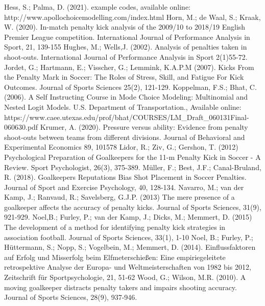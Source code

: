 \documentclass[12pt,dvipsnames]{article}%
\begin{document}
\begin{thebibliography}{99}
 Hess, S.; Palma, D. (2021). example codes, available online: http://www.apollochoicemodelling.com/index.html
 Horn, M.; de Waal, S.; Kraak, W. (2020). In-match penalty kick analysis of the 2009/10 to 2018/19 English Premier League competition. International Journal of Performance Analysis in Sport, 21, 139-155
 Hughes, M.; Wells,J. (2002). Analysis of penalties taken in shoot-outs. International Journal of Performance Analysis in Sport 2(1)55-72.
 Jordet, G.; Hartmann, E.; Visscher, G.; Lemmink, K.A.P.M (2007). Kicks From the Penalty Mark in Soccer: The Roles of Stress, Skill, and Fatigue For Kick Outcomes. Journal of Sports Sciences 25(2), 121-129.
 Koppelman, F.S.; Bhat, C. (2006). A Self Instructing Course in Mode Choice Modeling: Multinomial and Nested Logit Models. U.S. Department of Transportation., Available online: \small{https://www.caee.utexas.edu/prof/bhat/COURSES/LM\_Draft\_060131Final-060630.pdf}
 Krumer, A. (2020). Pressure versus ability: Evidence from penalty shoot-outs between teams from different divisions. Journal of Behavioral and Experimental Economics 89, 101578
 Lidor, R.; Ziv, G.; Gershon, T. (2012) Psychological Preparation of Goalkeepers for the 11-m Penalty Kick in Soccer - A Review. Sport Psychologist, 26(3), 375-389.
 M\"uller, F.; Best, J.F.; Canal-Bruland, R. (2018). Goalkeepers Reputations Bias Shot Placement in Soccer Penalties. Journal of Sport and Exercise Psychology, 40, 128-134.
 Navarro, M.; van der Kamp, J.; Ranvaud, R.; Savelsberg, G.J.P. (2013) The mere presence of a goalkeeper affects the accuracy of penalty kicks. Journal of Sports Sciences, 31(9), 921-929.
 Noel,B.; Furley, P.; van der Kamp, J.; Dicks, M.; Memmert, D. (2015) The development of a method for identifying penalty kick strategies
in association football. Journal of Sports Sciences, 33(1), 1-10
 Noel, B.; Furley, P.; H{\"u}ttermann, S.; Nopp, S.; Vogelbein, M.; Memmert, D. (2014). Einflussfaktoren auf Erfolg und Misserfolg beim Elfmeterschie\ss{}en:
Eine empiriegeleitete retrospektive Analyse der Europa- und Weltmeisterschaften von 1982 bis 2012, Zeitschrift f{\"u}r Sportpsychologie, 21, 51-62 
 Wood, G.; Wilson, M.R. (2010). A moving goalkeeper distracts penalty takers and impairs shooting accuracy. Journal of Sports Sciences, 28(9), 937-946.


\end{thebibliography}  
\end{document}
